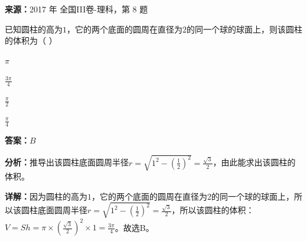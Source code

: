 \begin{question}[points=5]
\textbf{来源：}2017 年 全国III卷-理科，第 8 题\par
已知圆柱的高为$1$，它的两个底面的圆周在直径为$2$的同一个球的球面上，则该圆柱的体积为（ ）
\begin{choices}
  \item $\pi$
  \item $\frac{3\pi}{4}$
  \item $\frac{\pi}{2}$
  \item $\frac{\pi}{4}$
\end{choices}
\begin{solution}
\textbf{答案：}$B$

\textbf{分析：}推导出该圆柱底面圆周半径$r=\sqrt{1^2-(\frac{1}{2})^2}=\frac{\sqrt{3}}{2}$，由此能求出该圆柱的体积。

\textbf{详解：}因为圆柱的高为$1$，它的两个底面的圆周在直径为$2$的同一个球的球面上，所以该圆柱底面圆周半径$r=\sqrt{1^2-(\frac{1}{2})^2}=\frac{\sqrt{3}}{2}$，所以该圆柱的体积：$V=Sh=\pi\times(\frac{\sqrt{3}}{2})^2\times1=\frac{3\pi}{4}$。故选B。
\end{solution}
\end{question}

